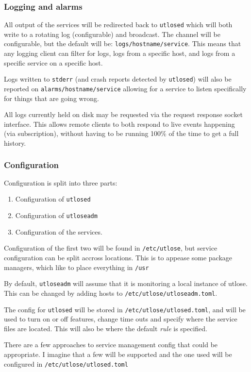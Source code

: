 \documentclass{article}
\begin{document}
\subsubsection{Logging and alarms}
All output of the services will be redirected back to \texttt{utlosed} which will both write to a rotating log
(configurable) and broadcast. The channel will be configurable, but the default will be: \texttt{logs/hostname/service}.
This means that any logging client can filter for logs, logs from a specific host, and logs from a specific service on a specific
host.

Logs written to \texttt{stderr} (and crash reports detected by \texttt{utlosed}) will also be reported on \texttt{alarms/hostname/service}
allowing for a service to listen specifically for things that are going wrong.

All logs currently held on disk may be requested via the request response socket interface. This allows remote clients to both
respond to live events happening (via subscription), without having to be running 100\% of the time to get a full history.

\subsubsection{Configuration}
Configuration is split into three parts:
\begin{enumerate}
  \item Configuration of \texttt{utlosed}
  \item Configuration of \texttt{utloseadm}
  \item Configuration of the services.
\end{enumerate}

Configuration of the first two will be found in \texttt{/etc/utlose}, but service configuration can be split
accross locations. This is to appease some package managers, which like to place everything in \texttt{/usr}

By default, \texttt{utloseadm} will assume that it is monitoring a local instance of utlose. This can be changed
by adding hosts to \texttt{/etc/utlose/utloseadm.toml}.

The config for \texttt{utlosed} will be stored in \texttt{/etc/utlose/utlosed.toml}, and will be used to turn on or off features,
change time outs and specify where the service files are located. This will also be where the default \textit{rule} is specified.

There are a few approaches to service management config that could be appropriate. I imagine that a few will be supported and
the one used will be configured in \texttt{/etc/utlose/utlosed.toml}
\end{document}
